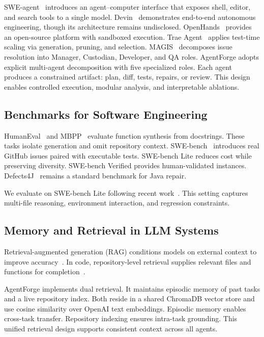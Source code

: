 \documentclass[journal]{IEEEtran}
\begin{document}
SWE-agent~\cite{yang2024sweagent} introduces an agent--computer interface that exposes shell, editor, and search tools to a single model. Devin~\cite{cognition2024devin} demonstrates end-to-end autonomous engineering, though its architecture remains undisclosed. OpenHands~\cite{wang2024openhands} provides an open-source platform with sandboxed execution. Trae Agent~\cite{trae2025} applies test-time scaling via generation, pruning, and selection. MAGIS~\cite{tao2024magis} decomposes issue resolution into Manager, Custodian, Developer, and QA roles.
AgentForge adopts explicit multi-agent decomposition with five specialized roles. Each agent produces a constrained artifact: plan, diff, tests, repairs, or review. This design enables controlled execution, modular analysis, and interpretable ablations.

\subsection{Benchmarks for Software Engineering}

HumanEval~\cite{chen2021codex} and MBPP~\cite{austin2021program} evaluate function synthesis from docstrings. These tasks isolate generation and omit repository context. SWE-bench~\cite{jimenez2024swebench} introduces real GitHub issues paired with executable tests. SWE-bench Lite reduces cost while preserving diversity. SWE-bench Verified provides human-validated instances. Defects4J~\cite{defects4j} remains a standard benchmark for Java repair.

We evaluate on SWE-bench Lite following recent work~\cite{yang2024sweagent,wang2024openhands,zhang2024autocoderover}. This setting captures multi-file reasoning, environment interaction, and regression constraints.

\subsection{Memory and Retrieval in LLM Systems}

Retrieval-augmented generation (RAG) conditions models on external context to improve accuracy~\cite{lewis2020rag}. In code, repository-level retrieval supplies relevant files and functions for completion~\cite{zhang2023repocoder,shrivastava2023repofusion}.

AgentForge implements dual retrieval. It maintains episodic memory of past tasks and a live repository index. Both reside in a shared ChromaDB vector store and use cosine similarity over OpenAI text embeddings. Episodic memory enables cross-task transfer. Repository indexing ensures intra-task grounding. This unified retrieval design supports consistent context across all agents.
\end{document}
